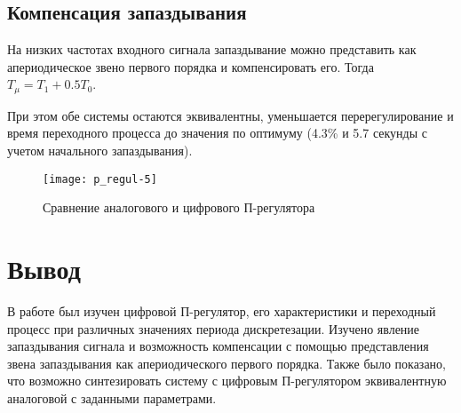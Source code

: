     \subsection{Компенсация запаздывания}
    На низких частотах входного сигнала запаздывание можно представить как апериодическое звено первого порядка и
    компенсировать его. Тогда $T_\mu = T_1 + 0.5T_0$.

    При этом обе системы остаются эквивалентны, уменьшается перерегулирование и время переходного процесса до значения
    по оптимуму (4.3\% и 5.7 секунды с учетом начального запаздывания).
    \begin{figure}[H]
        \centering\texttt{[image: p\_regul-5]}
        \caption{Сравнение аналогового и цифрового П-регулятора}
    \end{figure}


    \section{Вывод}
    В работе был изучен цифровой П-регулятор, его характеристики и переходный процесс при различных значениях периода
    дискретезации.
    Изучено явление запаздывания сигнала и возможность компенсации с помощью представления звена запаздывания как
    апериодического первого порядка.
    Также было показано, что возможно синтезировать систему с цифровым П-регулятором эквивалентную
    аналоговой с заданными параметрами.

